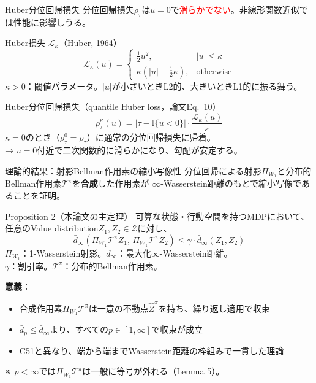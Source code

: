 \documentclass[aspectratio=169, dvipdfmx, 11pt]{beamer}
\newcommand{\red}[1]{\textcolor{red}{#1}}
\begin{document}
\begin{frame}{Huber分位回帰損失}
  {\small 分位回帰損失$\rho_\tau$は$u=0$で\red{滑らかでない}。非線形関数近似では性能に影響しうる。}
  \vfill
  \begin{block}{Huber損失 $\mathcal{L}_\kappa$（Huber, 1964）}
    {\small
    \[
      \mathcal{L}_\kappa(u) = \begin{cases}
        \frac{1}{2}u^2, & |u| \leq \kappa \\
        \kappa\!\left(|u| - \frac{1}{2}\kappa\right), & \text{otherwise}
      \end{cases}
    \]
    }
    {\scriptsize $\kappa > 0$：閾値パラメータ。$|u|$が小さいときL2的、大きいときL1的に振る舞う。}
  \end{block}
  \vfill
  \begin{exampleblock}{Huber分位回帰損失（quantile Huber loss，論文Eq.~10）}
    {\small
    \[
      \rho_\tau^\kappa(u) = |\tau - \mathbb{I}\{u < 0\}| \cdot \frac{\mathcal{L}_\kappa(u)}{\kappa}
    \]
    }
    {\scriptsize $\kappa = 0$のとき（$\rho_\tau^0 = \rho_\tau$）に通常の分位回帰損失に帰着。}\\
    {\scriptsize → $u = 0$付近で二次関数的に滑らかになり、勾配が安定する。}
  \end{exampleblock}
\end{frame}

\begin{frame}{理論的結果：射影Bellman作用素の縮小写像性}
  {\small 分位回帰による射影$\Pi_{W_1}$と分布的Bellman作用素$\mathcal{T}^\pi$を\textbf{合成}した作用素が
  $\infty$-Wasserstein距離のもとで縮小写像であることを証明。}

  \begin{exampleblock}{Proposition 2（本論文の主定理）}
    {\small 可算な状態・行動空間を持つMDPにおいて、任意のValue distribution$Z_1, Z_2 \in \mathcal{Z}$に対し、}
    {\small
    \[
      \bar{d}_\infty(\Pi_{W_1} \mathcal{T}^\pi Z_1, \, \Pi_{W_1} \mathcal{T}^\pi Z_2) \leq \gamma \cdot \bar{d}_\infty(Z_1, Z_2)
    \]
    }
    {\scriptsize $\Pi_{W_1}$：1-Wasserstein射影。$\bar{d}_\infty$：最大化$\infty$-Wasserstein距離。}\\
    {\scriptsize $\gamma$：割引率。$\mathcal{T}^\pi$：分布的Bellman作用素。}
  \end{exampleblock}
  \vfill
  {\small \textbf{意義}：}
  \begin{itemize}\setlength{\itemsep}{0pt}
    \item {\small 合成作用素$\Pi_{W_1}\mathcal{T}^\pi$は一意の不動点$\hat{Z}^\pi$を持ち、繰り返し適用で収束}
    \item {\small $\bar{d}_p \leq \bar{d}_\infty$より、すべての$p \in [1, \infty]$で収束が成立}
    \item {\small C51と異なり、\alert{端から端までWasserstein距離}の枠組みで一貫した理論}
  \end{itemize}
  \vfill
  {\scriptsize ※ $p < \infty$では$\Pi_{W_1}\mathcal{T}^\pi$は一般に等号が外れる（Lemma 5）。}
\end{frame}
\end{document}
